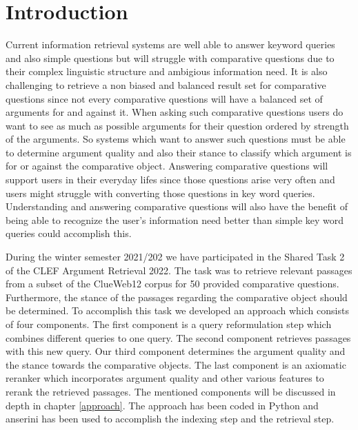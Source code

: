 \section{Introduction} \label{intro}
    Current information retrieval systems are well able to answer keyword queries and also simple questions but will struggle with comparative questions due to their complex linguistic structure and ambigious information need.  It is also challenging to retrieve  a non biased and balanced result set for comparative questions since not every comparative questions will have a balanced set of arguments for and against it. When asking such comparative questions users do want to see as much as possible arguments for their question  ordered by strength of the arguments. So systems which want to answer such questions must be able to determine argument quality and also their stance to classify which argument is for or against the comparative object.
    Answering comparative questions will support users in their everyday lifes since those questions arise very often and users might struggle with converting those questions in key word queries. Understanding and answering comparative questions will also have the benefit of being able to recognize the user's information need better than simple key word queries could accomplish this. 
    \par
    During the winter semester 2021/202 we have participated in the Shared Task 2 of the CLEF Argument Retrieval 2022. The task was to retrieve relevant passages from a subset of the ClueWeb12 corpus for 50 provided comparative questions. Furthermore, the stance of the passages regarding the comparative object should be determined. To accomplish this task we developed an approach which consists of four components. The first component is a query reformulation step which combines different queries to one query. The second component retrieves passages with this new query. Our third component determines the argument quality and the stance towards the comparative objects. The last component is an axiomatic reranker which incorporates argument quality and other various features to rerank the retrieved passages. The mentioned components will be discussed in depth in chapter \ref{approach}. The approach has been coded in Python and anserini has been used to accomplish the indexing step and the retrieval step.   